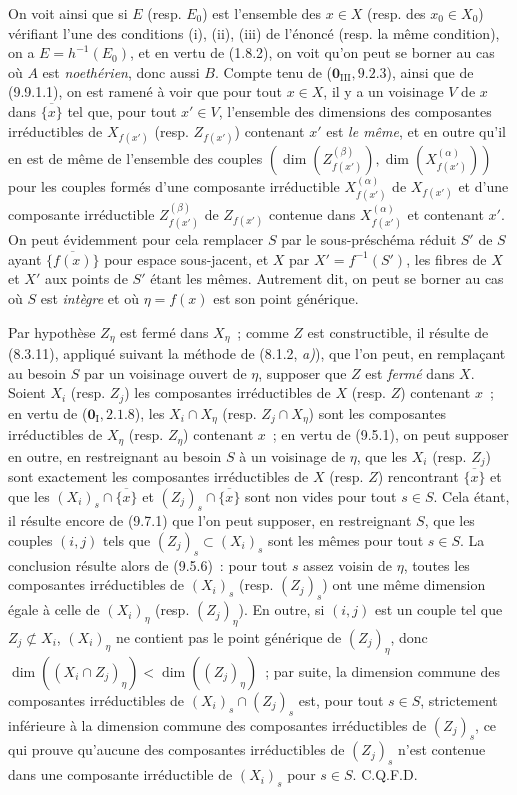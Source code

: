 On voit ainsi que si $E$ (resp. $E_0$) est l'ensemble des $x\in X$ (resp. des
$x_0\in X_0$) vérifiant l'une des conditions (i), (ii), (iii) de l'énoncé
(resp. la même condition), on a $E=h^{-1}(E_0)$, et en vertu de (1.8.2), on
voit qu'on peut se borner au cas où $A$ est \emph{noethérien}, donc aussi $B$.
Compte tenu de ($\mathbf 0_{\mathrm{III}},9.2.3$), ainsi que de (9.9.1.1), on
est ramené à voir que pour tout $x\in X$, il y a un voisinage $V$ de $x$ dans
$\overline{\{x\}}$ tel que, pour tout $x'\in V$, l'ensemble des dimensions des
composantes irréductibles de $X_{f(x')}$ (resp. $Z_{f(x')}$) contenant $x'$ est
\emph{le même}, et en outre qu'il en est de même de l'ensemble des couples
$(\dim(Z_{f(x')}^{(\beta)}),\dim(X_{f(x')}^{(\alpha)}))$
pour les couples formés d'une composante irréductible $X_{f(x')}^{(\alpha)}$
de $X_{f(x')}$ et d'une composante irréductible $Z_{f(x')}^{(\beta)}$ de
$Z_{f(x')}$ contenue dans $X_{f(x')}^{(\alpha)}$ et contenant $x'$. On peut
évidemment pour cela remplacer $S$ par le sous-préschéma réduit $S'$ de $S$
ayant $\overline{\{f(x)\}}$ pour espace sous-jacent, et $X$ par
$X'=f^{-1}(S')$, les fibres de $X$ et $X'$ aux points de $S'$ étant les mêmes.
Autrement dit, on peut se borner au cas où $S$ est \emph{intègre} et où
$\eta=f(x)$ est son point générique.

Par hypothèse $Z_\eta$ est fermé dans $X_\eta$~; comme $Z$ est constructible,
il résulte de (8.3.11), appliqué suivant la méthode de (8.1.2, \emph{a)}), que l'on
peut, en remplaçant au besoin $S$ par un voisinage ouvert de $\eta$, supposer
que $Z$ est \emph{fermé} dans $X$. Soient $X_i$ (resp. $Z_j$) les composantes
irréductibles de $X$ (resp. $Z$) contenant $x$~; en vertu de
($\mathbf 0_{\mathrm I},2.1.8$), les $X_i\cap X_\eta$ (resp.
$Z_j\cap X_\eta$) sont les composantes irréductibles de $X_\eta$ (resp.
$Z_\eta$) contenant $x$~; en vertu de (9.5.1), on peut supposer en outre, en
restreignant au besoin $S$ à un voisinage de $\eta$, que les $X_i$ (resp.
$Z_j$) sont exactement les composantes irréductibles de $X$ (resp. $Z$)
rencontrant $\overline{\{x\}}$ et que les
$(X_i)_s\cap\overline{\{x\}}$ et $(Z_j)_s\cap\overline{\{x\}}$ sont non vides
pour tout $s\in S$. Cela étant, il résulte encore de (9.7.1) que l'on peut
supposer, en restreignant $S$, que les couples $(i,j)$ tels que
$(Z_j)_s\subset(X_i)_s$ sont les mêmes pour tout $s\in S$. La conclusion
résulte alors de (9.5.6)~: pour tout $s$ assez voisin de $\eta$, toutes les
composantes irréductibles de $(X_i)_s$ (resp. $(Z_j)_s$) ont une même dimension
égale à celle de $(X_i)_\eta$ (resp. $(Z_j)_\eta$). En outre, si $(i,j)$ est un
couple tel que $Z_j\not\subset X_i$, $(X_i)_\eta$ ne contient pas le
point générique de $(Z_j)_\eta$, donc
$\dim((X_i\cap Z_j)_\eta)<\dim((Z_j)_\eta)$~; par suite, la dimension commune
des composantes irréductibles de $(X_i)_s\cap(Z_j)_s$ est, pour tout $s\in S$,
strictement inférieure à la dimension commune des composantes irréductibles de
$(Z_j)_s$, ce qui prouve qu'aucune des composantes irréductibles de $(Z_j)_s$
n'est contenue dans une composante irréductible de $(X_i)_s$ pour $s\in S$.
C.Q.F.D.

